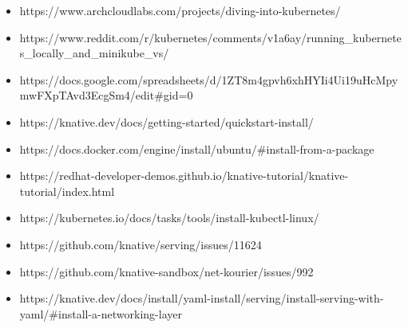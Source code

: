 \documentclass[12pt]{article}
\begin{document}
\begin{itemize}
\tightlist
\item
  https://www.archcloudlabs.com/projects/diving-into-kubernetes/
\item
  https://www.reddit.com/r/kubernetes/comments/v1a6ay/running\_kubernetes\_locally\_and\_minikube\_vs/
\item
  https://docs.google.com/spreadsheets/d/1ZT8m4gpvh6xhHYIi4Ui19uHcMpymwFXpTAvd3EcgSm4/edit\#gid=0
\item
  https://knative.dev/docs/getting-started/quickstart-install/
\item
  https://docs.docker.com/engine/install/ubuntu/\#install-from-a-package
\item
  https://redhat-developer-demos.github.io/knative-tutorial/knative-tutorial/index.html
\item
  https://kubernetes.io/docs/tasks/tools/install-kubectl-linux/
\item
  https://github.com/knative/serving/issues/11624
\item
  https://github.com/knative-sandbox/net-kourier/issues/992
\item
  https://knative.dev/docs/install/yaml-install/serving/install-serving-with-yaml/\#install-a-networking-layer
\end{itemize}
\end{document}
